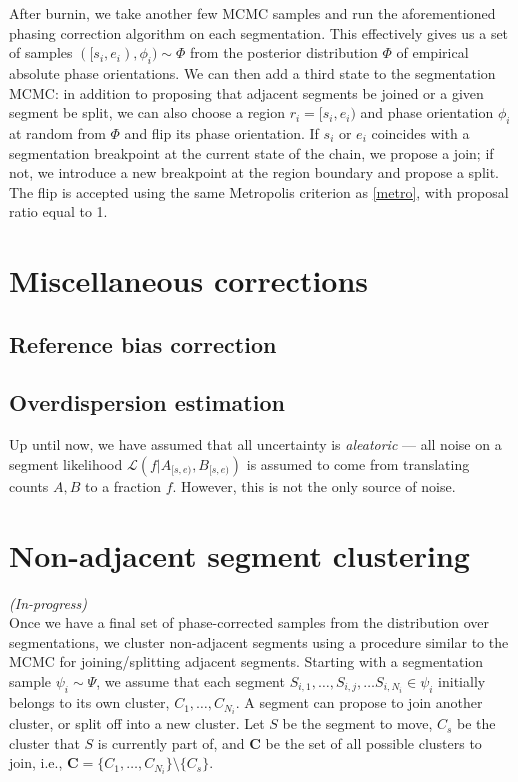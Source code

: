 \documentclass[10pt,letter]{article}
\numberwithin{equation}{section}
\begin{document}
After burnin, we take another few MCMC samples and run the aforementioned phasing correction algorithm on each segmentation. This effectively gives us a set of samples $([s_i,e_i),\phi_i)\sim\Phi$ from the posterior distribution $\Phi$ of empirical absolute phase orientations. We can then add a third state to the segmentation MCMC: in addition to proposing that adjacent segments be joined or a given segment be split, we can also choose a region $r_i=[s_i,e_i)$ and phase orientation $\phi_i$ at random from $\Phi$ and flip its phase orientation. If $s_i$ or $e_i$ coincides with a segmentation breakpoint at the current state of the chain, we propose a join; if not, we introduce a new breakpoint at the region boundary and propose a split. The flip is accepted using the same Metropolis criterion as \eqref{metro}, with proposal ratio equal to 1.

\section{Miscellaneous corrections}

\subsection{Reference bias correction}

\subsection{Overdispersion estimation}

Up until now, we have assumed that all uncertainty is \textit{aleatoric} --- all noise on a segment likelihood $\mathcal{L}(f|A_{[s,e)},B_{[s,e)})$ is assumed to come from translating counts $A,B$ to a fraction $f$. However, this is not the only source of noise. 


\section{Non-adjacent segment clustering}

\textit{(In-progress)}\\

\noindent Once we have a final set of phase-corrected samples from the distribution over segmentations, we cluster non-adjacent segments using a procedure similar to the MCMC for joining/splitting adjacent segments. Starting with a segmentation sample $\psi_i\sim\Psi$, we assume that each segment $S_{i,1},\dots, S_{i,j},\dots S_{i,N_i}\in \psi_i$ initially belongs to its own cluster, $C_1,\dots,C_{N_i}$. A segment can propose to join another cluster, or split off into a new cluster. Let $S$ be the segment to move, $C_s$ be the cluster that $S$ is currently part of, and $\mathbf C$ be the set of all possible clusters to join, i.e., $\mathbf{C} = \{C_1,\dots,C_{N_i}\}\setminus\{C_s\}$.
\end{document}
